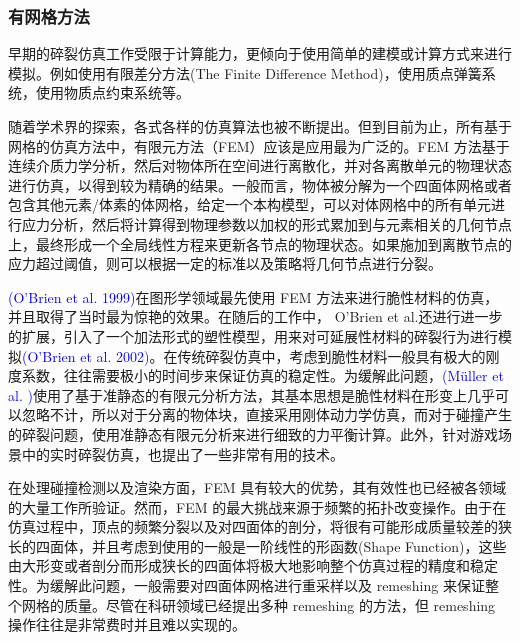 \subsubsection{有网格方法}

早期的碎裂仿真工作受限于计算能力，更倾向于使用简单的建模或计算方式来进行模拟。例如使用有限差分方法(The Finite Difference Method)，使用质点弹簧系统，使用物质点约束系统等。

随着学术界的探索，各式各样的仿真算法也被不断提出。但到目前为止，所有基于网格的仿真方法中，有限元方法（FEM）应该是应用最为广泛的。FEM 方法基于连续介质力学分析，然后对物体所在空间进行离散化，并对各离散单元的物理状态进行仿真，以得到较为精确的结果。一般而言，物体被分解为一个四面体网格或者包含其他元素/体素的体网格，给定一个本构模型，可以对体网格中的所有单元进行应力分析，然后将计算得到物理参数以加权的形式累加到与元素相关的几何节点上，最终形成一个全局线性方程来更新各节点的物理状态。如果施加到离散节点的应力超过阈值，则可以根据一定的标准以及策略将几何节点进行分裂。

\textcolor{blue}{(O'Brien et al. 1999)\parencite{OBrien1999}}在图形学领域最先使用 FEM 方法来进行脆性材料的仿真，并且取得了当时最为惊艳的效果。在随后的工作中， O'Brien et al.还进行进一步的扩展，引入了一个加法形式的塑性模型，用来对可延展性材料的碎裂行为进行模拟\textcolor{blue}{(O'Brien et al. 2002)\parencite{OBrien2002}}。在传统碎裂仿真中，考虑到脆性材料一般具有极大的刚度系数，往往需要极小的时间步来保证仿真的稳定性。为缓解此问题，\textcolor{blue}{(M\"{u}ller et al. )\parencite{Muller2001}}使用了基于准静态的有限元分析方法，其基本思想是脆性材料在形变上几乎可以忽略不计，所以对于分离的物体块，直接采用刚体动力学仿真，而对于碰撞产生的碎裂问题，使用准静态有限元分析来进行细致的力平衡计算。此外，针对游戏场景中的实时碎裂仿真，也提出了一些非常有用的技术。

在处理碰撞检测以及渲染方面，FEM 具有较大的优势，其有效性也已经被各领域的大量工作所验证。然而，FEM 的最大挑战来源于频繁的拓扑改变操作。由于在仿真过程中，顶点的频繁分裂以及对四面体的剖分，将很有可能形成质量较差的狭长的四面体，并且考虑到使用的一般是一阶线性的形函数(Shape Function)，这些由大形变或者剖分而形成狭长的四面体将极大地影响整个仿真过程的精度和稳定性。为缓解此问题，一般需要对四面体网格进行重采样以及 remeshing 来保证整个网格的质量。尽管在科研领域已经提出多种 remeshing 的方法，但 remeshing 操作往往是非常费时并且难以实现的。

